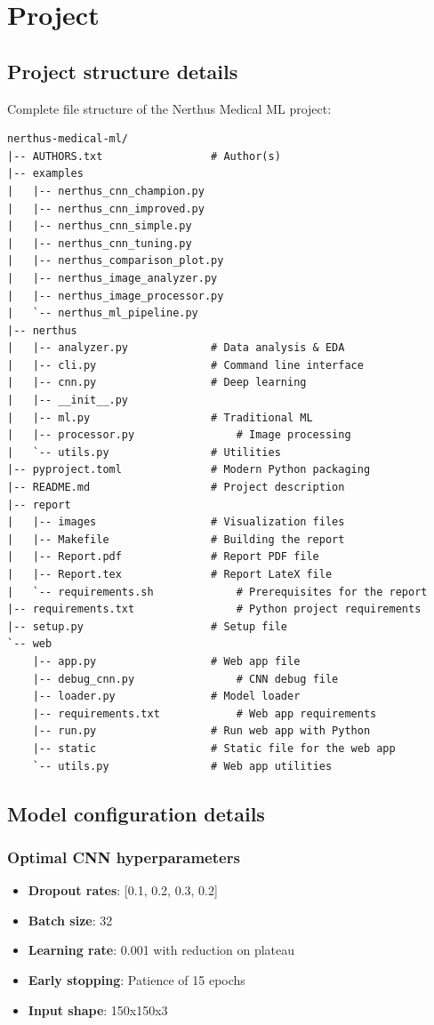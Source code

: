 \documentclass[11pt]{article}
\begin{document}
\section{Project}

\subsection{Project structure details}

Complete file structure of the Nerthus Medical ML project:

\begin{lstlisting}
nerthus-medical-ml/
|-- AUTHORS.txt					# Author(s)
|-- examples
|   |-- nerthus_cnn_champion.py
|   |-- nerthus_cnn_improved.py
|   |-- nerthus_cnn_simple.py
|   |-- nerthus_cnn_tuning.py
|   |-- nerthus_comparison_plot.py
|   |-- nerthus_image_analyzer.py
|   |-- nerthus_image_processor.py
|   `-- nerthus_ml_pipeline.py
|-- nerthus
|   |-- analyzer.py				# Data analysis & EDA
|   |-- cli.py					# Command line interface
|   |-- cnn.py					# Deep learning
|   |-- __init__.py
|   |-- ml.py					# Traditional ML
|   |-- processor.py				# Image processing
|   `-- utils.py				# Utilities
|-- pyproject.toml				# Modern Python packaging
|-- README.md					# Project description
|-- report
|   |-- images					# Visualization files
|   |-- Makefile				# Building the report
|   |-- Report.pdf				# Report PDF file
|   |-- Report.tex				# Report LateX file
|   `-- requirements.sh				# Prerequisites for the report
|-- requirements.txt				# Python project requirements
|-- setup.py					# Setup file
`-- web
    |-- app.py					# Web app file
    |-- debug_cnn.py				# CNN debug file
    |-- loader.py				# Model loader
    |-- requirements.txt			# Web app requirements
    |-- run.py					# Run web app with Python
    |-- static					# Static file for the web app
    `-- utils.py				# Web app utilities
\end{lstlisting}

\subsection{Model configuration details}

\subsubsection{Optimal CNN hyperparameters}
\begin{itemize}
    \item \textbf{Dropout rates}: [0.1, 0.2, 0.3, 0.2]
    \item \textbf{Batch size}: 32
    \item \textbf{Learning rate}: 0.001 with reduction on plateau
    \item \textbf{Early stopping}: Patience of 15 epochs
    \item \textbf{Input shape}: 150x150x3
\end{itemize}
\end{document}
